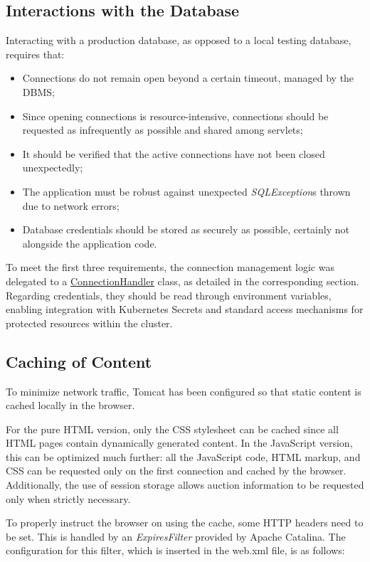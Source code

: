 \documentclass[12pt, a4paper, renqo, final]{amsart}
\begin{document}
		\subsection{Interactions with the Database}
		Interacting with a production database, as opposed to a local testing database, requires that:
		\begin{itemize}
		    \item Connections do not remain open beyond a certain timeout, managed by the DBMS;
		    \item Since opening connections is resource-intensive, connections should be requested as infrequently as possible and shared among servlets;
		    \item It should be verified that the active connections have not been closed unexpectedly;
		    \item The application must be robust against unexpected \textit{SQLException}s thrown due to network errors;
		    \item Database credentials should be stored as securely as possible, certainly not alongside the application code.
		\end{itemize}
		To meet the first three requirements, the connection management logic was delegated to a \hyperref[accessodb]{ConnectionHandler} class, as detailed in the corresponding section. Regarding credentials, they should be read through environment variables, enabling integration with Kubernetes Secrets and standard access mechanisms for protected resources within the cluster.

		\subsection{Caching of Content}
		To minimize network traffic, Tomcat has been configured so that static content is cached locally in the browser. 

		For the pure HTML version, only the CSS stylesheet can be cached since all HTML pages contain dynamically generated content. In the JavaScript version, this can be optimized much further: all the JavaScript code, HTML markup, and CSS can be requested only on the first connection and cached by the browser. Additionally, the use of session storage allows auction information to be requested only when strictly necessary.

		To properly instruct the browser on using the cache, some HTTP headers need to be set. This is handled by an \textit{ExpiresFilter} provided by Apache Catalina. The configuration for this filter, which is inserted in the web.xml file, is as follows:
\end{document}

